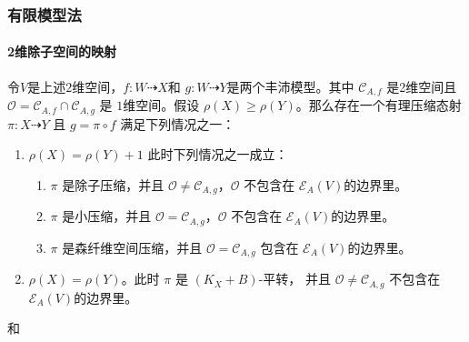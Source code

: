 \documentclass[10pt]{ctexbeamer}
\begin{document}
\begin{frame}[shrink]
  \frametitle{有限模型法}
  \framesubtitle{2维除子空间的映射}
  令$V$是上述$2$维空间，$ f:W\dashrightarrow X $和 $ g:W\dashrightarrow  Y $是两个丰沛模型。其中 $ \mathcal{C}_{A,f} $ 是2维空间且 $ \mathcal{O}=\mathcal{C}_{A,f}\cap \mathcal{C}_{A,g} $ 是 $ 1 $维空间。假设 $ \rho(X)\geqslant \rho(Y) $。那么存在一个有理压缩态射 $ \pi:X\dashrightarrow Y $ 且 $ g=\pi\circ f $ 满足下列情况之一：
  \begin{enumerate}
    \item $ \rho(X)=\rho(Y)+1 $ 此时下列情况之一成立：
          \begin{enumerate}
            \item $ \pi $ 是除子压缩，并且 $ \mathcal{O}\neq \mathcal{C}_{A,g} $，$ \mathcal{O} $ 不包含在 $ \mathcal{E}_A(V) $的边界里。
            \item $ \pi $ 是小压缩，并且 $ \mathcal{O}= \mathcal{C}_{A,g} $，$ \mathcal{O} $ 不包含在 $ \mathcal{E}_A(V) $的边界里。
            \item $ \pi $ 是森纤维空间压缩，并且 $ \mathcal{O}=\mathcal{C}_{A,g} $ 包含在 $ \mathcal{E}_{A}(V) $的边界里。
          \end{enumerate}
    \item $ \rho(X)=\rho(Y) $。此时  $ \pi $ 是 $ (K_X+B) $-平转， 并且 $ \mathcal{O}\neq\mathcal{C}_{A,g} $ 不包含在 $ \mathcal{E}_A(V) $的边界里。
  \end{enumerate}
 \begin{center}
  和
 \end{center} 
\end{frame}
\end{document}
